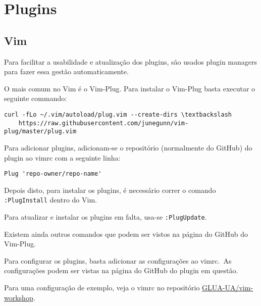 \chapter{Plugins}
\label{chap:plugins}

\section{Vim}

Para facilitar a usabilidade e atualização dos plugins, são usados plugin managers para fazer essa gestão automaticamente.

O mais comum no Vim é o Vim-Plug. Para instalar o Vim-Plug basta executar o seguinte commando:

\begin{lstlisting}
curl -fLo ~/.vim/autoload/plug.vim --create-dirs \textbackslash
    https://raw.githubusercontent.com/junegunn/vim-plug/master/plug.vim
\end{lstlisting}

Para adicionar plugins, adicionam-se o repositório (normalmente do GitHub) do plugin ao vimrc com a seguinte linha:

\begin{lstlisting}
Plug 'repo-owner/repo-name'
\end{lstlisting}

Depois disto, para instalar os plugins, é necessário correr o comando \texttt{:PlugInstall} dentro do Vim.

Para atualizar e instalar os plugins em falta, usa-se \texttt{:PlugUpdate}.

Existem ainda outros comandos que podem ser vistos na página do GitHub do Vim-Plug.

Para configurar os plugins, basta adicionar as configurações ao vimrc.\ As configurações podem ser vistas na página do GitHub do plugin em questão.

Para uma configuração de exemplo, veja o vimrc no repositório \href{https://github.com/GLUA-UA/vim-workshop/blob/master/.vimrc}{GLUA-UA/vim-workshop}.

